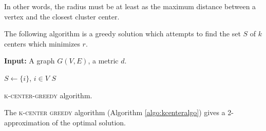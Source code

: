In other words, the radius must be at least as the maximum distance between a vertex and the closest cluster center.

The following algorithm is a greedy solution which attempts to find the set $S$ of $k$ centers which minimizes $r$.

\begin{algorithm}
	\textbf{Input:} A graph $G(V, E)$, a metric $d$.
	
	$S \gets \{ i \}$, $i \in V$\;
\Return $S$
\caption{\textsc{k-center-greedy} algorithm.}
\label{algo:kcenteralgo}
\end{algorithm}
\begin{thm}
	The \textsc{k-center greedy} algorithm (Algorithm \ref{algo:kcenteralgo}) gives a 2-approximation of the optimal solution.
\end{thm}

